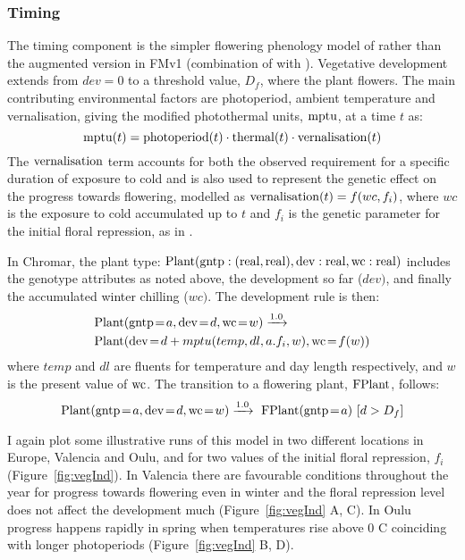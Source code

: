 \subsubsection*{Timing}
\label{timing}

The timing component is the simpler flowering phenology model of
\citet{wilczek_effects_2009} rather than the augmented version in FMv1
(combination of \citet{chew_augmented_2012} with
\citet{salazar_prediction_2009}). Vegetative development extends from \(dev = 0\)
to a threshold value, \(D_{f}\), where the plant flowers. The main contributing
environmental factors are photoperiod, ambient temperature and vernalisation,
giving the modified photothermal units, \(\mathrm{mptu}\), at a time \(t\) as:
\[\mathrm{mptu}(t) = \mathrm{photoperiod}(t) \cdot \mathrm{thermal}(t) \cdot \mathrm{vernalisation}(t)\]
The \(\mathrm{vernalisation}\) term accounts for both the observed requirement for
a specific duration of exposure to cold and is also used to represent the
genetic effect on the progress towards flowering, modelled as
\(\mathrm{vernalisation}(t) = f(wc,f_{i})\), where $wc$ is the exposure to
cold accumulated up to \(t\) and \(f_{i}\) is the genetic parameter for the
initial floral repression, as in \citet{wilczek_effects_2009}.

In Chromar, the plant type:
\(\mathrm{Plant}(\mathrm{gntp}:(\mathrm{real},\mathrm{real}),\mathrm{dev}:\mathrm{real},\mathrm{wc}:\mathrm{real})\)
includes the genotype attributes as noted above, the development so far
(\(dev)\), and finally the accumulated winter chilling (\(wc)\). The
development rule is then:
\begin{equation*}
\begin{split}
&\mr{Plant}(\ar{gntp}{a},\ar{dev}{d}, \ar{wc}{w}) \xrightarrow{1.0} \\ 
&\mr{Plant}(\ar{dev}{d + mptu( temp, dl, a.f_{i}, w )},\ar{wc}{f(w)})
\end{split}
\end{equation*}
where $temp$ and $dl$ are fluents for temperature and day
length respectively, and $w$ is the present value of $\mathrm{wc}$. The transition to a
flowering plant, \(\mathrm{FPlant}\), follows:
$$
\mr{Plant}(\ar{gntp}{a}, \ar{dev}{d}, \ar{wc}{w}) \xrightarrow{1.0} \mr{\ FPlant}(\ar{gntp}{a}) \, \, \lbrack d > D_{f} \rbrack
$$

I again plot some illustrative runs of this model in two different locations in
Europe, Valencia and Oulu, and for two values of the initial floral repression,
$f_i$ (Figure~\ref{fig:vegInd}). In Valencia there are favourable conditions
throughout the year for progress towards flowering even in winter and the floral
repression level does not affect the development much (Figure~\ref{fig:vegInd}
A, C). In Oulu progress happens rapidly in spring when temperatures rise above 0
\textdegree C coinciding with longer photoperiods (Figure~\ref{fig:vegInd} B,
D).

